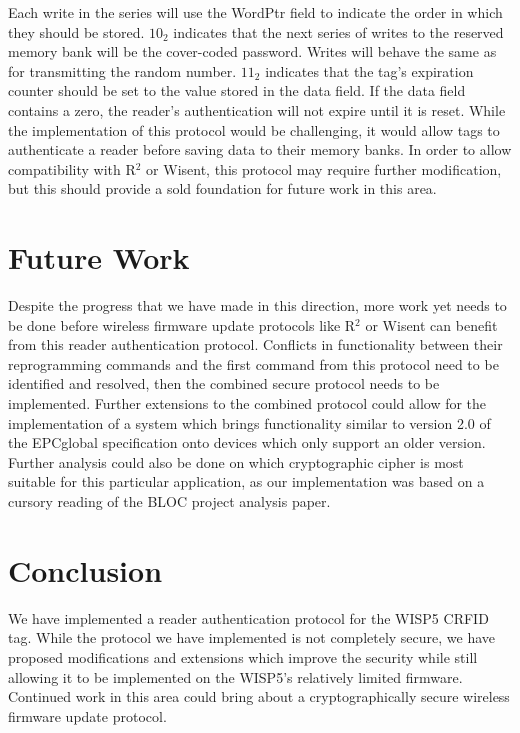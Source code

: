 \documentclass[journal]{IEEEtran}
\begin{document}
        Each write in the series will use the WordPtr field to indicate the order in which they should be stored.
        $10_2$ indicates that the next series of writes to the reserved memory bank will be the cover-coded password.
        Writes will behave the same as for transmitting the random number.
        $11_2$ indicates that the tag's expiration counter should be set to the value stored in the data field.
        If the data field contains a zero, the reader's authentication will not expire until it is reset.
        While the implementation of this protocol would be challenging, it would allow tags to authenticate a reader before saving data to their memory banks.
        In order to allow compatibility with R$^2$ or Wisent, this protocol may require further modification, but this should provide a sold foundation for future work in this area.
\section{Future Work}
    Despite the progress that we have made in this direction, more work yet needs to be done before wireless firmware update protocols like R$^2$ or Wisent can benefit from this reader authentication protocol.
    Conflicts in functionality between their reprogramming commands and the first command from this protocol need to be identified and resolved, then the combined secure protocol needs to be implemented.
    Further extensions to the combined protocol could allow for the implementation of a system which brings functionality similar to version 2.0 of the EPCglobal specification onto devices which only support an older version.
    Further analysis could also be done on which cryptographic cipher is most suitable for this particular application, as our implementation was based on a cursory reading of the BLOC project analysis paper.
\section{Conclusion}
    We have implemented a reader authentication protocol for the WISP5 CRFID tag.
    While the protocol we have implemented is not completely secure, we have proposed modifications and extensions which improve the security while still allowing it to be implemented on the WISP5's relatively limited firmware.
    Continued work in this area could bring about a cryptographically secure wireless firmware update protocol.
\end{document}
